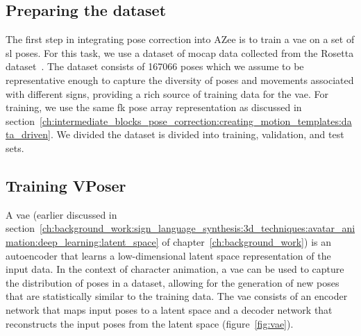 \documentclass[../../main.tex]{subfiles}
\begin{document}
\subsection{Preparing the dataset}
\label{ch:pose_correction:pose_correction_with_azee:dataset}

The first step in integrating pose correction into AZee is to train a \gls{vae} on a set of \gls{sl} poses. For this task, we use a dataset of \gls{mocap} data collected from the Rosetta dataset~\cite{bertin2022rosetta}. The dataset consists of 167066 poses which we assume to be representative enough to capture the diversity of poses and movements associated with different signs, providing a rich source of training data for the \gls{vae}. For training, we use the same \gls{fk} pose array representation as discussed in section~\ref{ch:intermediate_blocks_pose_correction:creating_motion_templates:data_driven}. We divided the dataset is divided into training, validation, and test sets.

\subsection{Training VPoser}
\label{ch:pose_correction:pose_correction_with_azee:training}

A \gls{vae} (earlier discussed in section~\ref{ch:background_work:sign_language_synthesis:3d_techniques:avatar_animation:deep_learning:latent_space} of chapter~\ref{ch:background_work}) is an autoencoder that learns a low-dimensional latent space representation of the input data. In the context of character animation, a \gls{vae} can be used to capture the distribution of poses in a dataset, allowing for the generation of new poses that are statistically similar to the training data. The \gls{vae} consists of an encoder network that maps input poses to a latent space and a decoder network that reconstructs the input poses from the latent space (figure~\ref{fig:vae}).
\end{document}
